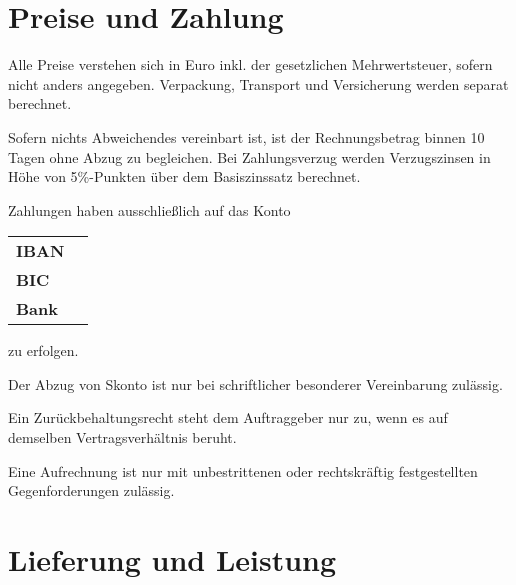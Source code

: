 \documentclass[fontsize=12pt,parskip=half]{scrartcl}
\begin{document}
\section{Preise und Zahlung}

\begin{contract}

\Clause[title={Preise}]

Alle Preise verstehen sich in Euro inkl. der gesetzlichen Mehrwertsteuer, sofern nicht anders angegeben. Verpackung, Transport und Versicherung werden separat berechnet.

\Clause[title={Zahlungsbedingungen}]

Sofern nichts Abweichendes vereinbart ist, ist der Rechnungsbetrag binnen 10 Tagen ohne Abzug zu begleichen. Bei Zahlungsverzug werden Verzugszinsen in Höhe von 5\%-Punkten über dem Basiszinssatz berechnet.

Zahlungen haben ausschließlich auf das Konto \newline
\begin{minipage}[t]{\dimexpr\linewidth-2em}
  \vspace{0.1em}\hspace{2em}
\begin{tabular}{ll}
  \textbf{IBAN} & \accountIBAN{} \\
  \textbf{BIC} & \accountBIC{} \\
  \textbf{Bank} & \accountBank{} \\
\end{tabular}\vspace{0.5em}
\end{minipage}\newline
zu erfolgen. 

Der Abzug von Skonto ist nur bei schriftlicher besonderer Vereinbarung zulässig.


\Clause[title={Aufrechnung und Zurückbehaltungsrecht}]

Ein Zurückbehaltungsrecht steht dem Auftraggeber nur zu, wenn es auf demselben Vertragsverhältnis beruht. 

Eine Aufrechnung ist nur mit unbestrittenen oder rechtskräftig festgestellten Gegenforderungen zulässig.

\end{contract}

\section{Lieferung und Leistung}
\end{document}

